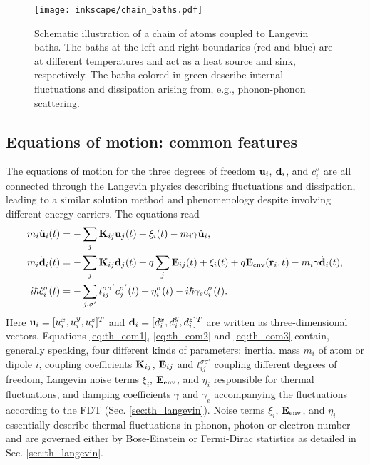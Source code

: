 \begin{figure}
 \begin{center}
 \texttt{[image: inkscape/chain\_baths.pdf]}
 \caption{Schematic illustration of a chain of atoms coupled to Langevin baths. The baths at the left and right boundaries (red and blue) are at different temperatures and act as a heat source and sink, respectively. The baths colored in green describe internal fluctuations and dissipation arising from, e.g., phonon-phonon scattering.}
 \label{fig:langevin_chain}
  \end{center}
\end{figure}

\subsection{Equations of motion: common features}
\label{sec:th_eom}

The equations of motion for the three degrees of freedom $\mathbf{u}_i$, $\mathbf{d}_i$, and $c_i^{\sigma}$ are all connected through the Langevin physics describing fluctuations and dissipation, leading to a similar solution method and phenomenology despite involving different energy carriers. The equations read  \cite{bolsterli70,rosa10,rosa11,dhar03}
\begin{subequations}
\begin{align}
 m_i \ddot{\mathbf{u}}_i(t) &=  - \sum_j \mathbf{K}_{ij}\mathbf{u}_j(t) + \xi_i(t) - m_i \gamma \dot{\mathbf{u}}_i, \label{eq:th_eom1} \\
 m_i \ddot{\mathbf{d}}_i(t) &= - \sum_j \mathbf{K}_{ij} \mathbf{d}_j(t) +q\sum_{j} \mathbf{E}_{ij}(t)+\xi_i(t)+ q\mathbf{E}_{\textrm{env}}(\mathbf{r}_i,t) - m_i \gamma \dot{\mathbf{d}}_i(t), \label{eq:th_eom2}\\
 i\hbar \dot{c}_i^{\sigma}(t) &= -\sum_{j,\sigma'} t_{ij}^{\sigma\sigma'} c_j^{\sigma'}(t) +\eta_i^{\sigma}(t) - i\hbar \gamma_e c_i^{\sigma}(t) \label{eq:th_eom3}.
\end{align}
\end{subequations}
Here $\mathbf{u}_i=[u_i^{x},u_i^y,u_i^z]^T$ and $\mathbf{d}_i=[d_i^x,d_i^y,d_i^z]^T$ are written as three-dimen\-sional vectors. Equations \eqref{eq:th_eom1}, \eqref{eq:th_eom2} and \eqref{eq:th_eom3} contain, generally speaking, four different kinds of parameters: inertial mass $m_i$ of atom or dipole $i$, coupling coefficients $\mathbf{K}_{ij}$, $\mathbf{E}_{ij}$ and $t_{ij}^{\sigma\sigma'}$ coupling different degrees of freedom, Langevin noise terms $\xi_i$, $\mathbf{E}_{\textrm{env}}$, and $\eta_i$ responsible for thermal fluctuations, and damping coefficients $\gamma$ and $\gamma_e$ accompanying the fluctuations according to the FDT (Sec. \ref{sec:th_langevin}). Noise terms $\xi_i$, $\mathbf{E}_{\textrm{env}}$, and $\eta_i$ essentially describe thermal fluctuations in phonon, photon or electron number and are governed either by Bose-Einstein or Fermi-Dirac statistics as detailed in Sec. \ref{sec:th_langevin}. %

